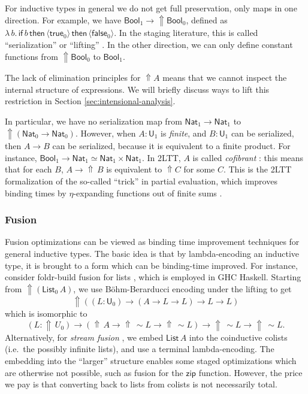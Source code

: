 \documentclass[acmsmall,review]{acmart}
\newcommand{\msf}[1]{\mathsf{#1}}
\newcommand{\Lift}{{\Uparrow}}
\newcommand{\spl}{{\sim}}
\newcommand{\qut}[1]{\langle #1\rangle}
\renewcommand{\U}{\msf{U}}
\newcommand{\Bool}{\msf{Bool}}
\newcommand{\true}{\msf{true}}
\newcommand{\false}{\msf{false}}
\newcommand{\List}{\msf{List}}
\newcommand{\Nat}{\msf{Nat}}
\theoremstyle{remark}
\begin{document}
For inductive types in general we do not get full preservation, only maps in one
direction. For example, we have $\Bool_1 \to \Lift \Bool_0$, defined as
$\lambda\,b.\,\msf{if}\,b\,\msf{then}\,\qut{\true_0}\,\msf{then}\,\qut{\false_0}$.
In the staging literature, this is called ``serialization'' or ``lifting''
\cite{template-haskell,metaml}.  In the other direction, we can only define
constant functions from $\Lift \Bool_0$ to $\Bool_1$.

The lack of elimination principles for $\Lift A$ means that we cannot inspect
the internal structure of expressions. We will briefly discuss ways to lift this
restriction in Section \ref{sec:intensional-analysis}.

In particular, we have no serialization map from $\Nat_1 \to \Nat_1$ to
$\Lift(\Nat_0 \to \Nat_0)$. However, when $A : \U_1$ is \emph{finite}, and $B :
\U_1$ can be serialized, then $A \to B$ can be serialized, because it is
equivalent to a finite product. For instance, $\Bool_1 \to \Nat_1 \simeq \Nat_1
\times \Nat_1$.  In 2LTT, $A$ is called \emph{cofibrant}
\cite[Section~3.4]{twolevel}: this means that for each $B$, $A \to \Lift\,B$ is
equivalent to $\Lift C$ for some $C$. This is the 2LTT formalization of the
so-called ``trick'' in partial evaluation, which improves binding times by
$\eta$-expanding functions out of finite sums \cite{eta-expansion-trick}.

\subsubsection{Fusion}
Fusion optimizations can be viewed as binding time improvement techniques for
general inductive types. The basic idea is that by lambda-encoding an inductive
type, it is brought to a form which can be binding-time improved. For instance,
consider foldr-build fusion for lists \cite{short-cut}, which is employed in GHC
Haskell.  Starting from $\Lift (\List_0\,A)$, we use Böhm-Berarducci encoding
\cite{boehm-berarducci} under the lifting to get
\[ \Lift((L : \U_0) \to (A \to L \to L) \to L \to L) \]
which is isomorphic to
\[ (L : \Lift\,U_0) \to (\Lift\,A \to \Lift\,\spl L \to \Lift\,\spl L)
    \to \Lift\,\spl L \to \Lift\,\spl L. \]
Alternatively, for \emph{stream fusion} \cite{stream-fusion}, we embed $\List\,A$ into the
coinductive colists (i.e.\ the possibly infinite lists), and use a terminal
lambda-encoding. The embedding into the ``larger'' structure enables some staged
optimizations which are otherwise not possible, such as fusion for the
$\msf{zip}$ function. However, the price we pay is that converting
back to lists from colists is not necessarily total.
\end{document}
